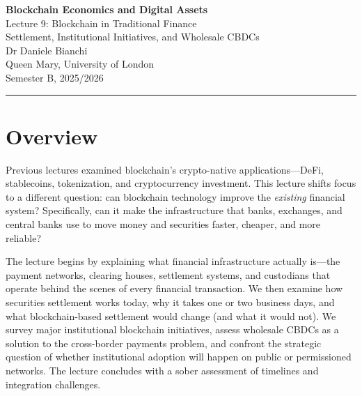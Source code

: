 \documentclass[11pt,a4paper]{article}
\begin{document}
\begin{center}
    {\LARGE\bfseries\textcolor{ImperialBlue}{Blockchain Economics and Digital Assets}}\\[0.5em]
    {\Large Lecture 9: Blockchain in Traditional Finance}\\[0.3em]
    {\large Settlement, Institutional Initiatives, and Wholesale CBDCs}\\[1em]
    {\large Dr Daniele Bianchi}\\[0.5em]
    {\normalsize Queen Mary, University of London}\\[0.3em]
    {\normalsize Semester B, 2025/2026}
\end{center}

\vspace{1em}
\hrule
\vspace{1em}

\tableofcontents

\vspace{2cm}

\section*{Overview}

Previous lectures examined blockchain's crypto-native applications---DeFi, stablecoins, tokenization, and cryptocurrency investment. This lecture shifts focus to a different question: can blockchain technology improve the \textit{existing} financial system? Specifically, can it make the infrastructure that banks, exchanges, and central banks use to move money and securities faster, cheaper, and more reliable?

The lecture begins by explaining what financial infrastructure actually is---the payment networks, clearing houses, settlement systems, and custodians that operate behind the scenes of every financial transaction. We then examine how securities settlement works today, why it takes one or two business days, and what blockchain-based settlement would change (and what it would not). We survey major institutional blockchain initiatives, assess wholesale CBDCs as a solution to the cross-border payments problem, and confront the strategic question of whether institutional adoption will happen on public or permissioned networks. The lecture concludes with a sober assessment of timelines and integration challenges.
\end{document}

